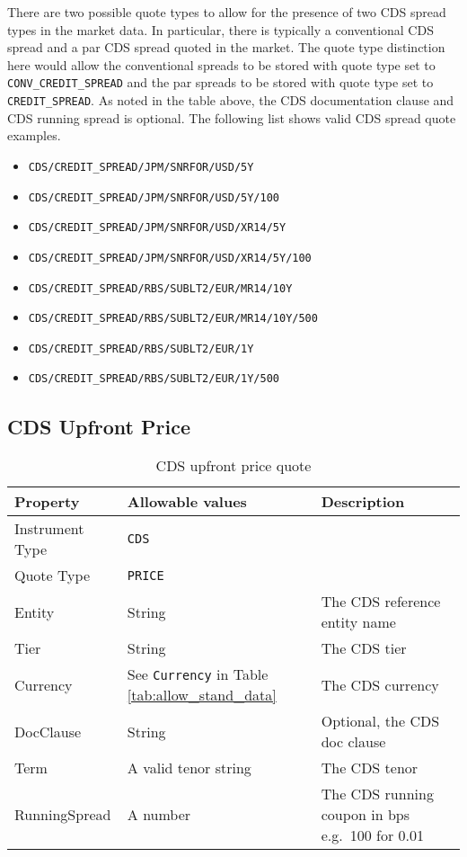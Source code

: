 There are two possible quote types to allow for the presence of two CDS spread types in the market data. In particular, there is typically a conventional CDS spread and a par CDS spread quoted in the market. The quote type distinction here would allow the conventional spreads to be stored with quote type set to \lstinline!CONV_CREDIT_SPREAD! and the par spreads to be stored with quote type set to \lstinline!CREDIT_SPREAD!. As noted in the table above, the CDS documentation clause and CDS running spread is optional. The following list shows valid CDS spread quote examples.
\begin{itemize}
\item \lstinline!CDS/CREDIT_SPREAD/JPM/SNRFOR/USD/5Y!
\item \lstinline!CDS/CREDIT_SPREAD/JPM/SNRFOR/USD/5Y/100!
\item \lstinline!CDS/CREDIT_SPREAD/JPM/SNRFOR/USD/XR14/5Y!
\item \lstinline!CDS/CREDIT_SPREAD/JPM/SNRFOR/USD/XR14/5Y/100!
\item \lstinline!CDS/CREDIT_SPREAD/RBS/SUBLT2/EUR/MR14/10Y!
\item \lstinline!CDS/CREDIT_SPREAD/RBS/SUBLT2/EUR/MR14/10Y/500!
\item \lstinline!CDS/CREDIT_SPREAD/RBS/SUBLT2/EUR/1Y!
\item \lstinline!CDS/CREDIT_SPREAD/RBS/SUBLT2/EUR/1Y/500!
\end{itemize}

\subsection{CDS Upfront Price}
\label{md:cds_price_quote}

\begin{table}[H]
\centering
  \begin{tabular}{|p{3cm}|p{3.5cm}|p{7cm}|}
    \hline
    {\bf Property} & {\bf Allowable values} & {\bf Description} \\ \hline
    Instrument Type & \lstinline!CDS! & \\ \hline
    Quote Type & \lstinline!PRICE! & \\ \hline
    Entity & String & The CDS reference entity name \\ \hline
    Tier & String & The CDS tier \\ \hline
    Currency & See \lstinline!Currency! in Table \ref{tab:allow_stand_data} & The CDS currency\\ \hline
    DocClause & String & Optional, the CDS doc clause \\ \hline
    Term & A valid tenor string & The CDS tenor\\ \hline
    RunningSpread & A number & The CDS running coupon in bps e.g.\ 100 for 0.01\\ \hline
  \end{tabular}
  \caption{CDS upfront price quote}
  \label{tab:cds_price_quote}
\end{table}

